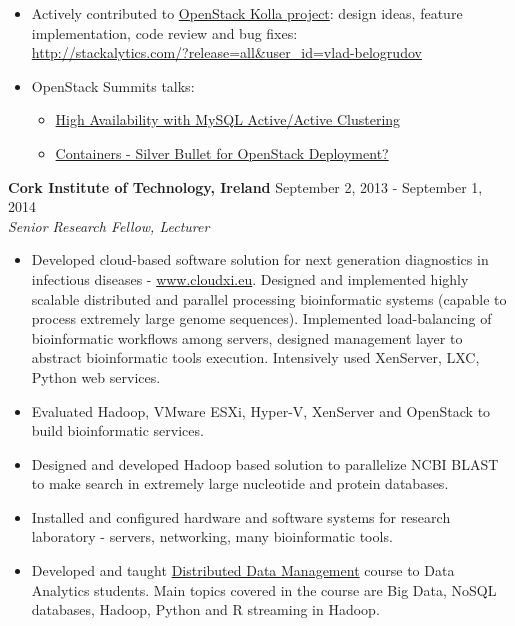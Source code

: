 \documentclass[a4paper,12pt,]{article}
\begin{document}
\begin{description}
\begin{itemize}
    \item Actively contributed to \href{https://docs.openstack.org/developer/kolla-ansible}{OpenStack Kolla project}: design ideas, feature implementation, code review and bug fixes:\\
       \url{http://stackalytics.com/?release=all&user_id=vlad-belogrudov}

    \item OpenStack Summits talks:
       \begin{itemize}
       \item \href{https://youtu.be/RJf7cwkytOE}{High Availability with MySQL Active/Active Clustering}
       \item \href{https://youtu.be/wzN3RHnVWdQ}{Containers - Silver Bullet for OpenStack Deployment?}
       \end{itemize}
    \end{itemize}

  \item{\bfseries Cork Institute of Technology, Ireland} \hfill September 2, 2013 - September 1, 2014 \\
    {\em Senior Research Fellow, Lecturer}

    \begin{itemize}

    \item Developed cloud-based software solution for next generation diagnostics in infectious diseases - \url{www.cloudxi.eu}. Designed and implemented highly scalable distributed and parallel processing bioinformatic systems (capable to process extremely large genome sequences). Implemented load-balancing of bioinformatic workflows among servers, designed management layer to abstract bioinformatic tools execution. Intensively used XenServer, LXC, Python web services.

    \item Evaluated Hadoop, VMware ESXi, Hyper-V, XenServer and OpenStack to build bioinformatic services.

    \item Designed and developed Hadoop based solution to parallelize NCBI BLAST to make search in extremely large nucleotide and protein databases.

    \item Installed and configured hardware and software systems for research laboratory - servers, networking, many bioinformatic tools.

    \item Developed and taught \href{https://courses.cit.ie/index.cfm/page/module/moduleId/13651}{Distributed Data Management} course to Data Analytics students. Main topics covered in the course are Big Data, NoSQL databases, Hadoop, Python and R streaming in Hadoop.


\end{itemize}
\end{description}
\end{document}
